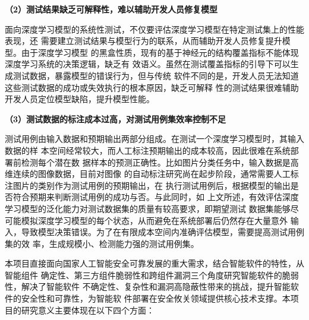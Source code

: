 \textbf{（2）测试结果缺乏可解释性，难以辅助开发人员修复模型}

面向深度学习模型的系统性测试，不仅要评估深度学习模型在特定测试集上的性能表现，还
需要建立测试结果与模型行为的联系，从而辅助开发人员修复提升模型。由于深度学习模型
的黑盒性质，现有的基于神经元的结构覆盖指标不能体现深度学习系统的决策逻辑，缺乏有
效语义。虽然在测试覆盖指标的引导下可以生成测试数据，暴露模型的错误行为，但与传统
软件不同的是，开发人员无法知道这些测试数据的成功或失效执行的根本原因，缺乏可解释
性的测试结果很难辅助开发人员定位模型缺陷，提升模型性能。

\textbf{（3）测试数据的标注成本过高，对测试用例集效率控制不足}

测试用例由输入数据和预期输出两部分组成。在测试一个深度学习模型时，其输入数据的样
本空间经常较大，而人工标注预期输出的成本较高，因此很难在系统部署前检测每个潜在数
据样本的预测正确性。比如图片分类任务中，输入数据是高维连续的图像数据，目前对图像
的自动标注研究尚在起步阶段，通常需要人工标注图片的类别作为测试用例的预期输出，在
执行测试用例后，根据模型的输出是否符合预期来判断测试用例的成功与否。与此同时，如
上文所述，有效评估深度学习模型的泛化能力对测试数据集的质量有较高要求，即期望测试
数据集能够尽可能模拟深度学习模型的每个状态，从而避免在系统部署后仍然存在大量意外
输入，导致模型决策错误。为了在有限成本空间内准确评估模型，需要提高测试用例集的效
率，生成规模小、检测能力强的测试用例集。


本项目直接面向国家人工智能安全可靠发展的重大需求，结合智能软件的特性，从智能组件
确定性、第三方组件脆弱性和跨组件漏洞三个角度研究智能软件的脆弱性，解决了智能软件
不确定性、复杂性和漏洞高隐蔽性带来的挑战，提升智能软件的安全性和可靠性，为智能软
件部署在安全攸关领域提供核心技术支撑。本项目的研究意义主要体现在以下四个方面：

